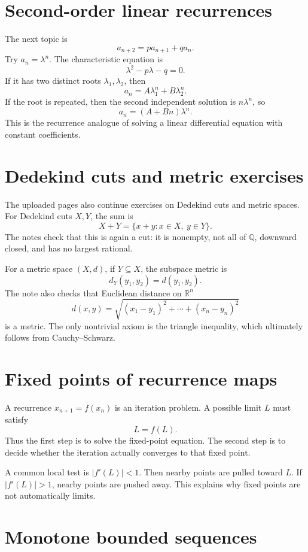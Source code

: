 \section{Second-order linear recurrences}

The next topic is
\[
  a_{n+2}=pa_{n+1}+qa_n.
\]
Try \(a_n=\lambda^n\).  The characteristic equation is
\[
  \lambda^2-p\lambda-q=0.
\]
If it has two distinct roots \(\lambda_1,\lambda_2\), then
\[
  a_n=A\lambda_1^n+B\lambda_2^n.
\]
If the root is repeated, then the second independent solution is \(n\lambda^n\), so
\[
  a_n=(A+Bn)\lambda^n.
\]
This is the recurrence analogue of solving a linear differential equation with constant coefficients.

\section{Dedekind cuts and metric exercises}

The uploaded pages also continue exercises on Dedekind cuts and metric spaces.  For Dedekind cuts \(X,Y\), the sum is
\[
  X+Y=\{x+y:x\in X,\ y\in Y\}.
\]
The notes check that this is again a cut: it is nonempty, not all of \(\mathbb Q\), downward closed, and has no largest rational.

For a metric space \((X,d)\), if \(Y\subseteq X\), the subspace metric is
\[
  d_Y(y_1,y_2)=d(y_1,y_2).
\]
The note also checks that Euclidean distance on \(\mathbb R^n\)
\[
  d(x,y)=\sqrt{(x_1-y_1)^2+\cdots+(x_n-y_n)^2}
\]
is a metric.  The only nontrivial axiom is the triangle inequality, which ultimately follows from Cauchy--Schwarz.


\section{Fixed points of recurrence maps}

A recurrence \(x_{n+1}=f(x_n)\) is an iteration problem.  A possible limit \(L\) must satisfy
\[
  L=f(L).
\]
Thus the first step is to solve the fixed-point equation.  The second step is to decide whether the iteration actually converges to that fixed point.

A common local test is \(|f'(L)|<1\).  Then nearby points are pulled toward \(L\).  If \(|f'(L)|>1\), nearby points are pushed away.  This explains why fixed points are not automatically limits.

\section{Monotone bounded sequences}

